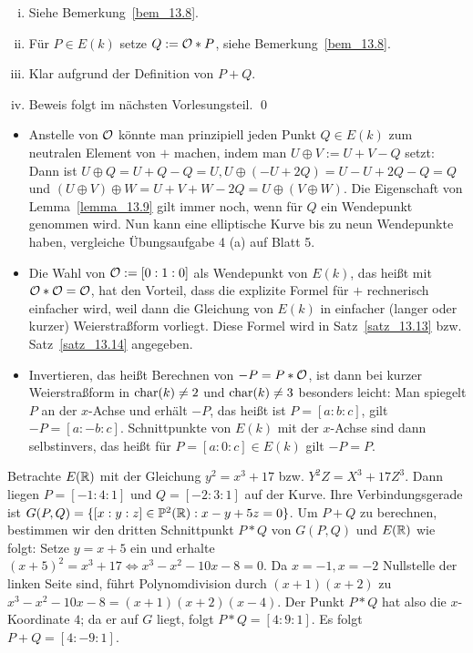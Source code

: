 	\begin{enumerate}[(i)]
		\item Siehe Bemerkung~\ref{bem_13.8}.
		\item Für $P \in E(k)$ setze $Q := \mathcal{O} * P$, siehe Bemerkung~\ref{bem_13.8}.
		\item Klar aufgrund der Definition von $P+Q$.
		\item Beweis folgt im nächsten Vorlesungsteil. \qed
	\end{enumerate}
	
\begin{bem}
	\begin{itemize}
		\item Anstelle von $\mathcal{O}$ könnte man prinzipiell jeden Punkt $Q \in E(k)$ zum neutralen Element von $+$ machen, indem man $U \oplus V := U + V - Q$ setzt: Dann ist $U \oplus Q = U + Q - Q = U, U \oplus(-U+2Q) = U-U+2Q-Q = Q$ und $(U \oplus V) \oplus W = U + V + W - 2Q = U \oplus (V \oplus W)$. Die Eigenschaft von Lemma~\ref{lemma_13.9} gilt immer noch, wenn für $Q$ ein Wendepunkt genommen wird. Nun kann eine elliptische Kurve bis zu neun Wendepunkte haben, vergleiche Übungsaufgabe 4 (a) auf Blatt 5.
		\item Die Wahl von $\mathcal{O} := [0:1:0]$ als Wendepunkt von $E(k)$, das heißt mit $\mathcal{O} * \mathcal{O} = \mathcal{O}$, hat den Vorteil, dass die explizite Formel für $+$ rechnerisch einfacher wird, weil dann die Gleichung von $E(k)$ in einfacher (langer oder kurzer) Weierstraßform vorliegt. Diese Formel wird in Satz~\ref{satz_13.13} bzw. Satz~\ref{satz_13.14} angegeben.
		\item Invertieren, das heißt Berechnen von $-P = P * \mathcal{O}$, ist dann bei kurzer Weierstraßform in $\operatorname{char}(k) \neq 2$ und $\operatorname{char}(k) \neq 3$ besonders leicht: Man spiegelt $P$ an der $x$-Achse und erhält $-P$, das heißt ist $P = [a:b:c]$, gilt $-P = [a:-b:c]$. Schnittpunkte von $E(k)$ mit der $x$-Achse sind dann selbstinvers, das heißt für $P = [a:0:c] \in E(k)$ gilt $-P = P$.
	\end{itemize}
\end{bem}

\begin{bsp}
	Betrachte $E(\mathbb{R})$ mit der Gleichung $y^2 = x^3 + 17$ bzw. $Y^2Z = X^3 + 17Z^3$. Dann liegen $P = [-1:4:1]$ und $Q = [-2:3:1]$ auf der Kurve. Ihre Verbindungsgerade ist $G(P,Q) = \{ [x:y:z] \in \mathbb{P}^2(\mathbb{R}) : x-y+5z = 0\}$. Um $P+Q$ zu berechnen, bestimmen wir den dritten Schnittpunkt $P*Q$ von $G(P,Q)$ und $E(\mathbb{R})$ wie folgt: Setze $y = x + 5$ ein und erhalte $(x+5)^2 = x^3 + 17 \Leftrightarrow x^3 - x^2 - 10x - 8 = 0$. Da $x = -1, x = -2$ Nullstelle der linken Seite sind, führt Polynomdivision durch $(x+1)(x+2)$ zu $x^3-x^2-10x-8 = (x+1)(x+2)(x-4)$. Der Punkt $P * Q$ hat also die $x$-Koordinate $4$; da er auf $G$ liegt, folgt $P*Q = [4:9:1]$. Es folgt $P + Q = [4:-9:1]$.
\end{bsp}

